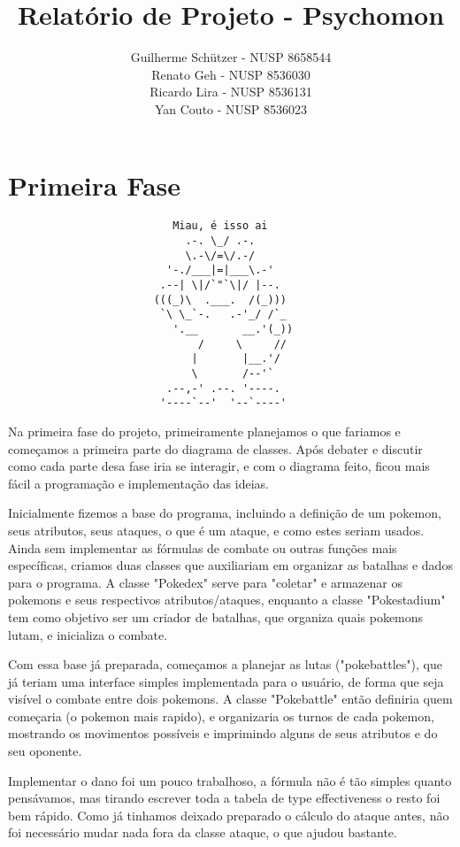 \documentclass[a4paper]{article}
\title{Relatório de Projeto - Psychomon}
\author{
Guilherme Schützer - NUSP 8658544 \\
Renato Geh         - NUSP 8536030 \\
Ricardo Lira       - NUSP 8536131 \\
Yan Couto          - NUSP 8536023
}
\date{}
\begin{document}
\maketitle


\section{Primeira Fase}

\begin{verbatim}
                          Miau, é isso ai
                            .-. \_/ .-.
                            \.-\/=\/.-/
                         '-./___|=|___\.-'
                        .--| \|/`"`\|/ |--.
                       (((_)\  .___.  /(_)))
                        `\ \_`-.   .-'_/ /`_
                          '.__       __.'(_))
                              /     \     //
                             |       |__.'/
                             \       /--'`
                         .--,-' .--. '----.
                        '----`--'  '--`----'
\end{verbatim}

 Na primeira fase do projeto, primeiramente planejamos o que fariamos e
começamos a primeira parte do diagrama de classes. Após debater e discutir como
cada parte desa fase iria se interagir, e com o diagrama feito, ficou mais fácil
a programação e implementação das ideias.

    Inicialmente fizemos a base do programa, incluindo a definição de um
pokemon, seus atributos, seus ataques, o que é um ataque, e como estes
seriam usados. Ainda sem implementar as fórmulas de combate ou outras funções
mais específicas, criamos duas classes que auxiliariam em organizar as
batalhas e dados para o programa. A classe "Pokedex" serve para "coletar" e
armazenar os pokemons e seus respectivos atributos/ataques, enquanto a classe
"Pokestadium" tem como objetivo ser um criador de batalhas, que organiza quais
pokemons lutam, e inicializa o combate.

    Com essa base já preparada, começamos a planejar as lutas ("pokebattles"),
que já teriam uma interface simples implementada para o usuário, de forma que
seja visível o combate entre dois pokemons. A classe "Pokebattle" então
definiria quem começaria (o pokemon mais rapido), e organizaria os turnos de
cada pokemon, mostrando os movimentos possíveis e imprimindo alguns de seus
atributos e do seu oponente.

    Implementar o dano foi um pouco trabalhoso, a fórmula não é tão simples
quanto pensávamos, mas tirando escrever toda a tabela de type effectiveness 
o resto foi bem rápido. Como já tinhamos deixado preparado o cálculo do ataque
antes, não foi necessário mudar nada fora da classe ataque, o que ajudou bastante.
\end{document}
